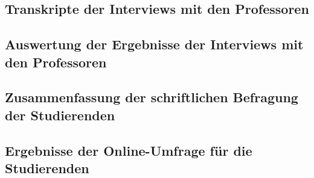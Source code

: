 \documentclass[bibliography=totoc,listof=totoc,BCOR=5mm,DIV=12,oneside]{scrbook}
\begin{document}
\newpage
\subsection{Transkripte der Interviews mit den Professoren}
\label{anhang:interviewProfessorenTranskripte}






\newpage
\subsection{Auswertung der Ergebnisse der Interviews mit den Professoren}
\label{anhang:interviewProfessorenAuswertung}


\newpage
\subsection{Zusammenfassung der schriftlichen Befragung der Studierenden}
\label{anhang:schriftlicheBefragungStudierendeZusammenfassung}


\newpage
\subsection{Ergebnisse der Online-Umfrage für die Studierenden}
\label{anhang:onlineUmfrageStudierendeErgebnisse}

\end{document}

